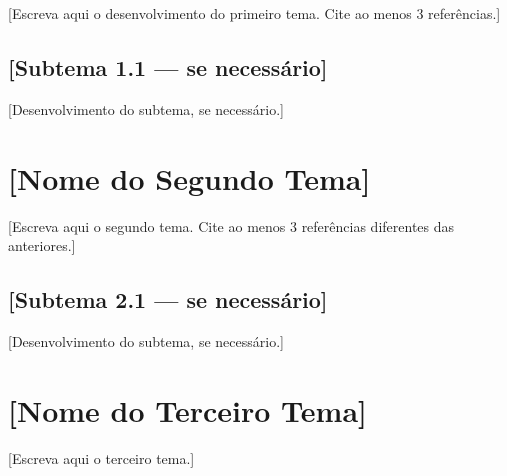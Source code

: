 [Escreva aqui o desenvolvimento do primeiro tema. Cite ao menos 3 referências.]

\subsection{[Subtema 1.1 — se necessário]}


[Desenvolvimento do subtema, se necessário.]



\section{[Nome do Segundo Tema]}

%

[Escreva aqui o segundo tema. Cite ao menos 3 referências diferentes das anteriores.]

\subsection{[Subtema 2.1 — se necessário]}

[Desenvolvimento do subtema, se necessário.]



\section{[Nome do Terceiro Tema]}


[Escreva aqui o terceiro tema.]


